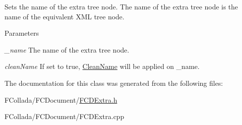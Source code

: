 \label{classFCDENode_a4f60977945ccf9769bce6558cce2ce62}
Sets the name of the extra tree node. The name of the extra tree node is the name of the equivalent XML tree node. 
\begin{DoxyParams}{Parameters}
\item[{\em \_\-name}]The name of the extra tree node. \item[{\em cleanName}]If set to true, \hyperlink{classFCDENode_ac26e5f14dd8ab111f75d06105224616e}{CleanName} will be applied on \_\-name. \end{DoxyParams}


The documentation for this class was generated from the following files:\begin{DoxyCompactItemize}
\item 
FCollada/FCDocument/\hyperlink{FCDExtra_8h}{FCDExtra.h}\item 
FCollada/FCDocument/FCDExtra.cpp\end{DoxyCompactItemize}
